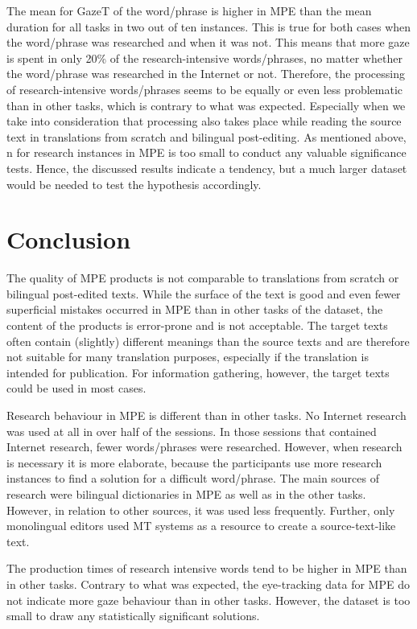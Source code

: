 \documentclass[output=paper]{langsci/langscibook}
\begin{document}
The mean for GazeT of the word/phrase is higher in MPE than the mean duration for all tasks in two out of ten instances. This is true for both cases when the word/phrase was researched and when it was not. This means that more gaze is spent in only 20\% of the research-intensive words/phrases, no matter whether the word/phrase was researched in the Internet or not. Therefore, the processing of research-intensive words/phrases seems to be equally or even less problematic than in other tasks, which is contrary to what was expected. Especially when we take into consideration that processing also takes place while reading the source text in translations from scratch and bilingual post-editing. As mentioned above, n for research instances in MPE is too small to conduct any valuable significance tests. Hence, the discussed results indicate a tendency, but a much larger dataset would be needed to test the hypothesis accordingly.


\section{Conclusion\label{nitzke:sec:Conclusion}}

The quality of MPE products is not comparable to translations from scratch or bilingual post-edited texts. While the surface of the text is good and even fewer superficial mistakes occurred in MPE than in other tasks of the dataset, the content of the products is error-prone and is not acceptable. The target texts often contain (slightly) different meanings than the source texts and are therefore not suitable for many translation purposes, especially if the translation is intended for publication. For information gathering, however, the target texts could be used in most cases.


Research behaviour in MPE is different than in other tasks. No Internet research was used at all in over half of the sessions. In those sessions that contained Internet research, fewer words/phrases were researched. However, when research is necessary it is more elaborate, because the participants use more research instances to find a solution for a difficult word/phrase. The main sources of research were bilingual dictionaries in MPE as well as in the other tasks. However, in relation to other sources, it was used less frequently. Further, only monolingual editors used MT systems as a resource to create a source-text-like text.



The production times of research intensive words tend to be higher in MPE than in other tasks. Contrary to what was expected, the eye-tracking data for MPE do not indicate more gaze behaviour than in other tasks. However, the dataset is too small to draw any statistically significant solutions.
\end{document}

